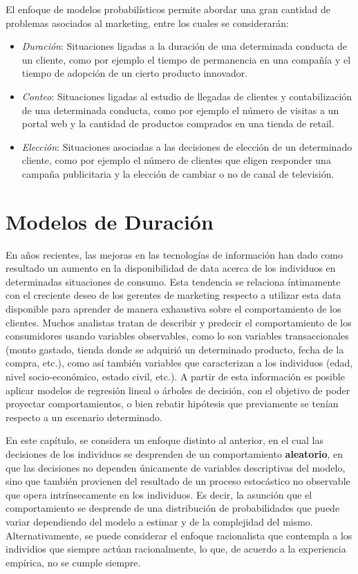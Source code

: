 \documentclass[
]{book}
\begin{document}
El enfoque de modelos probabilísticos permite abordar una gran cantidad
de problemas asociados al marketing, entre los cuales se considerarán:

\begin{itemize}
\item
  \emph{Duración}: Situaciones ligadas a la duración de una determinada
  conducta de un cliente, como por ejemplo el tiempo de permanencia en
  una compañía y el tiempo de adopción de un cierto producto
  innovador.
\item
  \emph{Conteo}: Situaciones ligadas al estudio de llegadas de clientes y
  contabilización de una determinada conducta, como por ejemplo el
  número de visitas a un portal web y la cantidad de productos
  comprados en una tienda de retail.
\item
  \emph{Elección}: Situaciones asociadas a las decisiones de elección de un
  determinado cliente, como por ejemplo el número de clientes que
  eligen responder una campaña publicitaria y la elección de cambiar o
  no de canal de televisión.
\end{itemize}

\section{Modelos de Duración}\label{modelos-de-duraciuxf3n}

En años recientes, las mejoras en las tecnologías de información han
dado como resultado un aumento en la disponibilidad de data acerca de
los individuos en determinadas situaciones de consumo. Esta tendencia se
relaciona íntimamente con el creciente deseo de los gerentes de
marketing respecto a utilizar esta data disponible para aprender de
manera exhaustiva sobre el comportamiento de los clientes. Muchos
analistas tratan de describir y predecir el comportamiento de los
consumidores usando variables observables, como lo son variables
transaccionales (monto gastado, tienda donde se adquirió un determinado
producto, fecha de la compra, etc.), como así también variables que
caracterizan a los individuos (edad, nivel socio-económico, estado
civil, etc.). A partir de esta información es posible aplicar modelos de
regresión lineal o árboles de decisión, con el objetivo de poder
proyectar comportamientos, o bien rebatir hipótesis que previamente se
tenían respecto a un escenario determinado.

En este capítulo, se considera un enfoque distinto al anterior, en el
cual las decisiones de los individuos se desprenden de un comportamiento
\textbf{aleatorio}, en que las decisiones no dependen únicamente de variables
descriptivas del modelo, sino que también provienen del resultado de un
proceso estocástico no observable que opera intrínsecamente en los
individuos. Es decir, la asunción que el comportamiento se desprende de
una distribución de probabilidades que puede variar dependiendo del
modelo a estimar y de la complejidad del mismo. Alternativamente, se
puede considerar el enfoque racionalista que contempla a los individios
que siempre actúan racionalmente, lo que, de acuerdo a la experiencia
empírica, no se cumple siempre.
\end{document}
